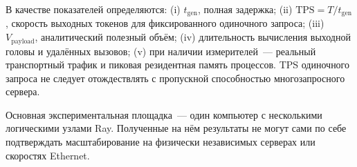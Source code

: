 В качестве показателей определяются: (i) $t_{\mathrm{gen}}$, полная задержка; (ii) $\mathrm{TPS}=T/t_{\mathrm{gen}}$, скорость выходных токенов для фиксированного одиночного запроса; (iii) $V_{\mathrm{payload}}$, аналитический полезный объём; (iv) длительность вычисления выходной головы и удалённых вызовов; (v) при наличии измерителей~--- реальный транспортный трафик и пиковая резидентная память процессов. TPS одиночного запроса не следует отождествлять с пропускной способностью многозапросного сервера.

Основная экспериментальная площадка~--- один компьютер с несколькими логическими узлами Ray. Полученные на нём результаты не могут сами по себе подтверждать масштабирование на физически независимых серверах или скоростях Ethernet.
